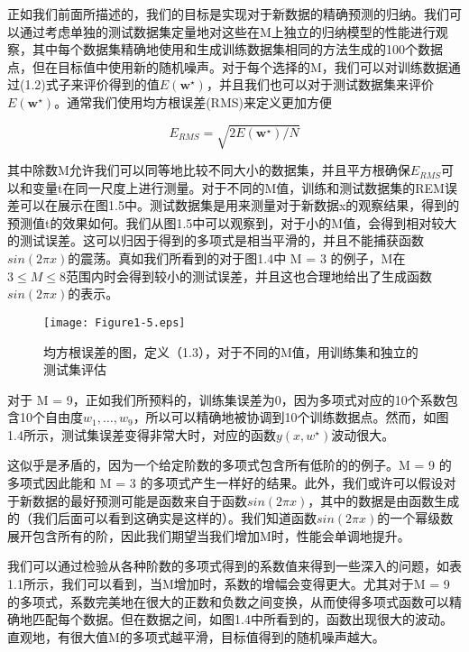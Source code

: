 	正如我们前面所描述的，我们的目标是实现对于新数据的精确预测的归纳。我们可以通过考虑单独的测试数据集定量地对这些在M上独立的归纳模型的性能进行观察，其中每个数据集精确地使用和生成训练数据集相同的方法生成的100个数据点，但在目标值中使用新的随机噪声。对于每个选择的M，我们可以对训练数据通过(1.2)式子来评价得到的值$E(\mathbf{w}^{\star})$，并且我们也可以对于测试数据集来评价$E(\mathbf{w}^{\star})$。通常我们使用均方根误差(RMS)来定义更加方便
	
	\begin{equation}
	E_{RMS} = \sqrt{2E(\mathbf{w}^{\star})/N}
	\end{equation}
	
	其中除数M允许我们可以同等地比较不同大小的数据集，并且平方根确保$E_{RMS}$可以和变量t在同一尺度上进行测量。对于不同的M值，训练和测试数据集的REM误差可以在展示在图1.5中。测试数据集是用来测量对于新数据x的观察结果，得到的预测值t的效果如何。我们从图1.5中可以观察到，对于小的M值，会得到相对较大的测试误差。这可以归因于得到的多项式是相当平滑的，并且不能捕获函数$sin(2 \pi x)$的震荡。真如我们所看到的对于图1.4中 M = 3 的例子，M在$3 \leq M \leq 8$范围内时会得到较小的测试误差，并且这也合理地给出了生成函数$sin(2 \pi x)$的表示。

\begin{figure}
	\parbox{.4\textwidth}{\caption{均方根误差的图，定义（1.3），对于不同的M值，用训练集和独立的测试集评估}}
	\parbox{.5\textwidth}{\texttt{[image: Figure1-5.eps]}}
	\label{fig:endb-flow} 
\end{figure}

	对于 M = 9，正如我们所预料的，训练集误差为0，因为多项式对应的10个系数包含10个自由度$w_1,\dots,w_9$，所以可以精确地被协调到10个训练数据点。然而，如图1.4所示，测试集误差变得非常大时，对应的函数$y(x, w^{\star})$波动很大。
	
	这似乎是矛盾的，因为一个给定阶数的多项式包含所有低阶的的例子。M = 9 的多项式因此能和 M = 3 的多项式产生一样好的结果。此外，我们或许可以假设对于新数据的最好预测可能是函数来自于函数$sin(2 \pi x)$，其中的数据是由函数生成的（我们后面可以看到这确实是这样的）。我们知道函数$sin(2 \pi x)$的一个幂级数展开包含所有的阶，因此我们期望当我们增加M时，性能会单调地提升。
	
	我们可以通过检验从各种阶数的多项式得到的系数值来得到一些深入的问题，如表1.1所示，我们可以看到，当M增加时，系数的增幅会变得更大。尤其对于M = 9 的多项式，系数完美地在很大的正数和负数之间变换，从而使得多项式函数可以精确地匹配每个数据。但在数据之间，如图1.4中所看到的，函数出现很大的波动。直观地，有很大值M的多项式越平滑，目标值得到的随机噪声越大。
	
